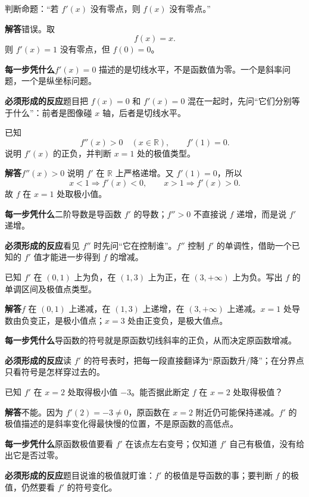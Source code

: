 \documentclass[11pt,fontset=fandol]{ctexart}
\newcommand{\R}{\mathbb R}
\newcommand{\answer}{\par\textbf{解答}\quad}
\newcommand{\basis}{\par\textbf{每一步凭什么}\quad}
\newcommand{\reaction}{\par\textbf{必须形成的反应}\quad}
\newenvironment{drill}[2]{
  \begin{tcolorbox}[colback=white,colframe=black!35,title={#1\quad\small #2},breakable]
}{\end{tcolorbox}}
\begin{document}
\begin{drill}{41. 导函数零点个数不等于原函数零点个数}{项目导数题库辨析题}
判断命题：“若 $f'(x)$ 没有零点，则 $f(x)$ 没有零点。”

\answer 错误。取
\[
f(x)=x.
\]
则 $f'(x)=1$ 没有零点，但 $f(0)=0$。

\basis $f'(x)=0$ 描述的是切线水平，不是函数值为零。一个是斜率问题，一个是纵坐标问题。

\reaction 题目把 $f(x)=0$ 和 $f'(x)=0$ 混在一起时，先问“它们分别等于什么”：前者是图像碰 $x$ 轴，后者是切线水平。
\end{drill}

\begin{drill}{42. 二阶导数研究的是一阶导数的增减}{项目导数题库改编}
已知
\[
f''(x)>0\quad(x\in\R),\qquad f'(1)=0.
\]
说明 $f'(x)$ 的正负，并判断 $x=1$ 处的极值类型。

\answer $f''(x)>0$ 说明 $f'$ 在 $\R$ 上严格递增。又 $f'(1)=0$，所以
\[
x<1\Rightarrow f'(x)<0,\qquad x>1\Rightarrow f'(x)>0.
\]
故 $f$ 在 $x=1$ 处取极小值。

\basis 二阶导数是导函数 $f'$ 的导数；$f''>0$ 不直接说 $f$ 递增，而是说 $f'$ 递增。

\reaction 看见 $f''$ 时先问“它在控制谁”。$f''$ 控制 $f'$ 的单调性，借助一个已知的 $f'$ 值才能进一步得到 $f$ 的增减。
\end{drill}

\begin{drill}{43. 导函数图像读的是原函数的增减}{人教B版导函数图像题型改编}
已知 $f'$ 在 $(0,1)$ 上为负，在 $(1,3)$ 上为正，在 $(3,+\infty)$ 上为负。写出 $f$ 的单调区间及极值点类型。

\answer $f$ 在 $(0,1)$ 上递减，在 $(1,3)$ 上递增，在 $(3,+\infty)$ 上递减。$x=1$ 处导数由负变正，是极小值点；$x=3$ 处由正变负，是极大值点。

\basis 导函数的符号就是原函数切线斜率的正负，从而决定原函数增减。

\reaction 读 $f'$ 的符号表时，把每一段直接翻译为“原函数升/降”；在分界点只看符号是怎样穿过去的。
\end{drill}

\begin{drill}{44. 导函数的极值不等于原函数的极值}{人教B版导函数图像题型改编}
已知 $f'$ 在 $x=2$ 处取得极小值 $-3$。能否据此断定 $f$ 在 $x=2$ 处取得极值？

\answer 不能。因为 $f'(2)=-3\ne0$，原函数在 $x=2$ 附近仍可能保持递减。$f'$ 的极值描述的是斜率变化得最快慢的位置，不是原函数的高低点。

\basis 原函数极值要看 $f'$ 在该点左右变号；仅知道 $f'$ 自己有极值，没有给出它是否过零。

\reaction 题目说谁的极值就盯谁：$f'$ 的极值是导函数的事；要判断 $f$ 的极值，仍然要看 $f'$ 的符号变化。
\end{drill}
\end{document}
